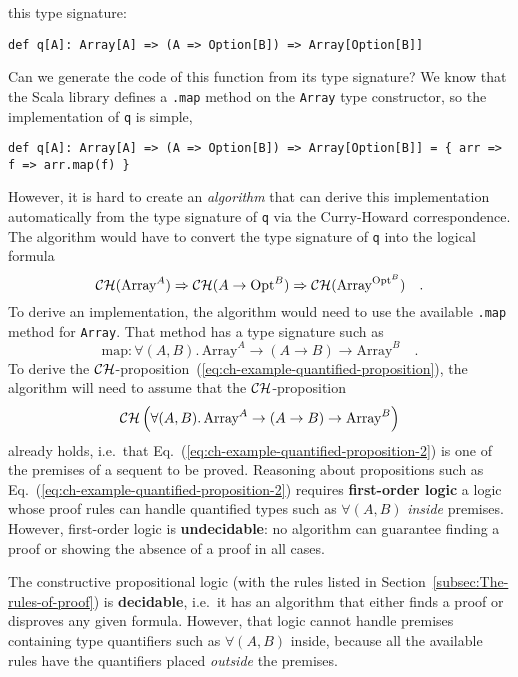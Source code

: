 this type signature:
\begin{lstlisting}
def q[A]: Array[A] => (A => Option[B]) => Array[Option[B]]
\end{lstlisting}
Can we generate the code of this function from its type signature?
We know that the Scala library defines a \lstinline!.map! method
on the \lstinline!Array! type constructor, so the implementation
of \lstinline!q! is simple,
\begin{lstlisting}
def q[A]: Array[A] => (A => Option[B]) => Array[Option[B]] = { arr => f => arr.map(f) }
\end{lstlisting}
However, it is hard to create an \emph{algorithm} that can derive
this implementation automatically from the type signature of \lstinline!q!
via the Curry-Howard correspondence. The algorithm would have to convert
the type signature of \lstinline!q! into the logical formula 
\begin{equation}
{\cal CH}(\text{Array}^{A})\Rightarrow{\cal CH}(A\rightarrow\text{Opt}^{B})\Rightarrow{\cal CH}(\text{Array}^{\text{Opt}^{B}})\quad.\label{eq:ch-example-quantified-proposition}
\end{equation}
To derive an implementation, the algorithm would need to use the available
\lstinline!.map! method for \lstinline!Array!. That method has a
type signature such as
\[
\text{map}:\forall(A,B).\,\text{Array}^{A}\rightarrow\left(A\rightarrow B\right)\rightarrow\text{Array}^{B}\quad.
\]
To derive the ${\cal CH}$-proposition~(\ref{eq:ch-example-quantified-proposition}),
the algorithm will need to assume that the ${\cal CH}$-proposition
\begin{equation}
{\cal CH}\left(\forall(A,B).\,\text{Array}^{A}\rightarrow\left(A\rightarrow B\right)\rightarrow\text{Array}^{B}\right)\label{eq:ch-example-quantified-proposition-2}
\end{equation}
already holds, i.e.~that Eq.~(\ref{eq:ch-example-quantified-proposition-2})
is one of the premises of a sequent to be proved. Reasoning about
propositions such as Eq.~(\ref{eq:ch-example-quantified-proposition-2})
requires \textbf{first-order logic} \textendash{}
a logic whose proof rules can handle quantified types such as $\forall(A,B)$\emph{
inside} premises. However, first-order logic is \textbf{undecidable}:
no algorithm can guarantee finding a proof or showing the absence
of a proof in all cases. 

The constructive propositional logic (with the rules listed in Section~\ref{subsec:The-rules-of-proof})
is \textbf{decidable}, i.e.~it has an algorithm
that either finds a proof or disproves any given formula. However,
that logic cannot handle premises containing type quantifiers such
as $\forall(A,B)$ inside, because all the available rules have the
quantifiers placed \emph{outside} the premises. 

